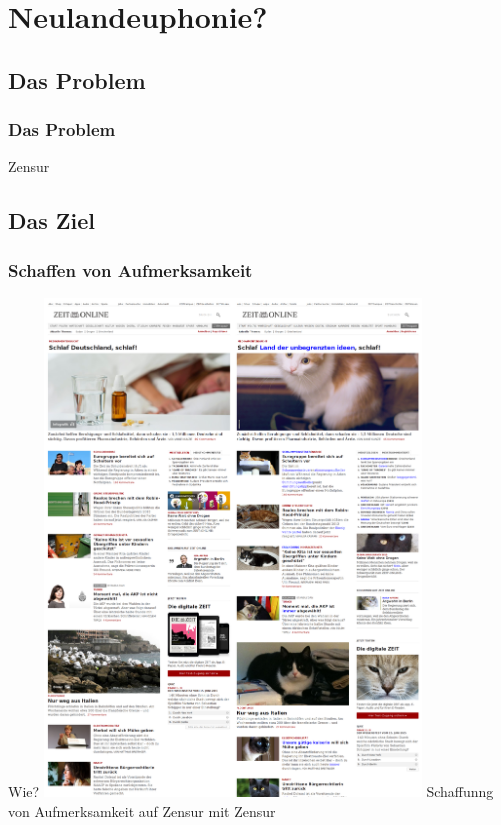\documentclass [xcolor=dvipsnames] {beamer}
\begin{document}
\section{Neulandeuphonie?}
\subsection{Das Problem}
\begin{frame}
	\frametitle{\sc Das Problem}
	\begin{center}
		{\Huge Zensur}
	\end{center}
\end{frame}

\subsection{Das Ziel}
\subsubsection{Schaffen von Aufmerksamkeit}
\begin{frame}
	\begin{center}
		{
			{\Huge Wie?}
		}
		\only<3>
		{
			\includegraphics[width=10cm]{combined}
		}
		\only<1>
		{
			Schaffunng von Aufmerksamkeit auf Zensur mit Zensur
		}
	\end{center}
\end{frame}
\end{document}
